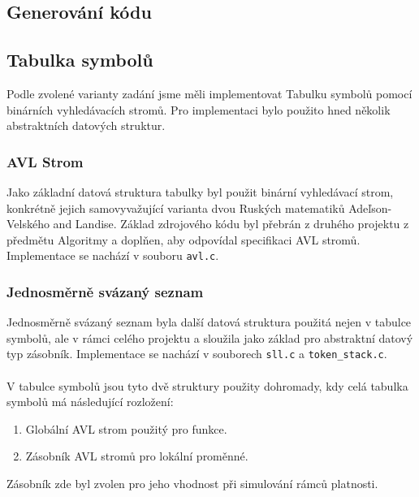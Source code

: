 \documentclass[a4paper]{article}
\theoremstyle{definition}
\begin{document}
\subsection{Generování kódu}%

\subsection{Tabulka symbolů}\label{sec_symtable}
Podle zvolené varianty zadání jsme měli implementovat Tabulku symbolů pomocí binárních vyhledávacích stromů.
Pro implementaci bylo použito hned několik abstraktních datových struktur.

\subsubsection{AVL Strom}
Jako základní datová struktura tabulky byl použit binární vyhledávací strom, konkrétně jejich samovyvažující varianta dvou Ruských matematiků Adeľson-Velského and Landise. Základ zdrojového kódu byl přebrán z druhého projektu z předmětu Algoritmy a doplňen, aby odpovídal specifikaci AVL stromů. Implementace se nachází v souboru \texttt{avl.c}.

\subsubsection{Jednosměrně svázaný seznam}
Jednosměrně svázaný seznam byla další datová struktura použitá nejen v tabulce symbolů, ale v rámci celého projektu
a sloužila jako základ pro abstraktní datový typ zásobník\label{tstack}. Implementace se nachází v souborech \texttt{sll.c} a \texttt{token\_stack.c}.
\\ \\
V tabulce symbolů jsou tyto dvě struktury použity dohromady, kdy celá tabulka symbolů má následující rozložení:
\begin{enumerate}
    \item Globální AVL strom použitý pro funkce.
    \item Zásobník AVL stromů pro lokální proměnné.
\end{enumerate}

Zásobník zde byl zvolen pro jeho vhodnost při simulování rámců platnosti.
\end{document}
